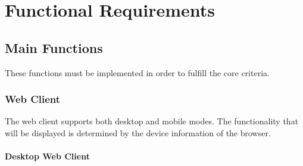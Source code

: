 \section{Functional Requirements}

\subsection{Main Functions}
These functions must be implemented in order to fulfill the core criteria.

\subsubsection{Web Client}
The web client supports both desktop and mobile modes. The functionality that will be displayed is determined by the device information of the browser.

\paragraph{Desktop Web Client}


\def\twodigits#1{%
  \ifnum#1<10 0\fi
  \number#1}

